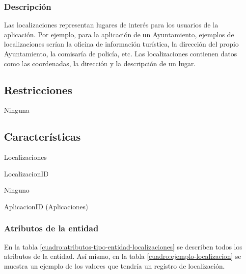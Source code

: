 \subsubsection*{Descripción}
Las localizaciones representan lugares de interés para los usuarios de la aplicación. Por ejemplo, para la aplicación de un Ayuntamiento, ejemplos de localizaciones serían la oficina de información turística, la dirección del propio Ayuntamiento, la comisaría de policía, etc. Las localizaciones contienen datos como las coordenadas, la dirección y la descripción de un lugar.

\subsection*{Restricciones}
Ninguna

\subsection*{Características}
\begin{description}[nosep,style=multiline,labelindent=0.8cm,leftmargin=4.5cm,font=\normalfont]
    \item[Nombre] Localizaciones
    \item[Id. principal] LocalizacionID
    \item[Id. alternativo] Ninguno
    \item[Atrib. heredados] AplicacionID (Aplicaciones)
\end{description}

\subsubsection*{Atributos de la entidad}
En la tabla \ref{cuadro:atributos-tipo-entidad-localizaciones} se describen todos los atributos de la entidad. Así mismo, en la tabla \ref{cuadro:ejemplo-localizacion} se muestra un ejemplo de los valores que tendría un registro de localización.

